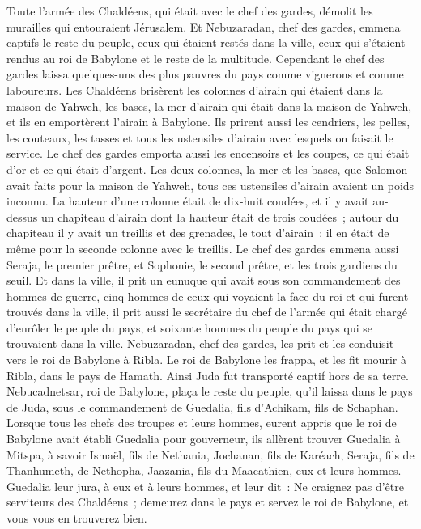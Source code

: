 \begin{multicols}{2}
Toute l'armée des Chaldéens, qui était avec le chef des gardes, démolit les murailles qui entouraient Jérusalem.
Et Nebuzaradan, chef des gardes, emmena captifs le reste du peuple, ceux qui étaient restés dans la ville, ceux qui s'étaient rendus au roi de Babylone et le reste de la multitude.
Cependant le chef des gardes laissa quelques-uns des plus pauvres du pays comme vignerons et comme laboureurs.
Les Chaldéens brisèrent les colonnes d'airain qui étaient dans la maison de Yahweh, les bases, la mer d'airain qui était dans la maison de Yahweh, et ils en emportèrent l'airain à Babylone.
Ils prirent aussi les cendriers, les pelles, les couteaux, les tasses et tous les ustensiles d'airain avec lesquels on faisait le service.
Le chef des gardes emporta aussi les encensoirs et les coupes, ce qui était d'or et ce qui était d'argent.
Les deux colonnes, la mer et les bases, que Salomon avait faits pour la maison de Yahweh, tous ces ustensiles d'airain avaient un poids inconnu.
La hauteur d'une colonne était de dix-huit coudées, et il y avait au-dessus un chapiteau d'airain dont la hauteur était de trois coudées~; autour du chapiteau il y avait un treillis et des grenades, le tout d'airain~; il en était de même pour la seconde colonne avec le treillis.
Le chef des gardes emmena aussi Seraja, le premier prêtre, et Sophonie, le second prêtre, et les trois gardiens du seuil.
Et dans la ville, il prit un eunuque qui avait sous son commandement des hommes de guerre, cinq hommes de ceux qui voyaient la face du roi et qui furent trouvés dans la ville, il prit aussi le secrétaire du chef de l'armée qui était chargé d'enrôler le peuple du pays, et soixante hommes du peuple du pays qui se trouvaient dans la ville.
Nebuzaradan, chef des gardes, les prit et les conduisit vers le roi de Babylone à Ribla.
Le roi de Babylone les frappa, et les fit mourir à Ribla, dans le pays de Hamath. Ainsi Juda fut transporté captif hors de sa terre.
Nebucadnetsar, roi de Babylone, plaça le reste du peuple, qu'il laissa dans le pays de Juda, sous le commandement de Guedalia, fils d'Achikam, fils de Schaphan.
Lorsque tous les chefs des troupes et leurs hommes, eurent appris que le roi de Babylone avait établi Guedalia pour gouverneur, ils allèrent trouver Guedalia à Mitspa, à savoir Ismaël, fils de Nethania, Jochanan, fils de Karéach, Seraja, fils de Thanhumeth, de Nethopha, Jaazania, fils du Maacathien, eux et leurs hommes.
Guedalia leur jura, à eux et à leurs hommes, et leur dit~: Ne craignez pas d'être serviteurs des Chaldéens~; demeurez dans le pays et servez le roi de Babylone, et vous vous en trouverez bien.

\end{multicols}
